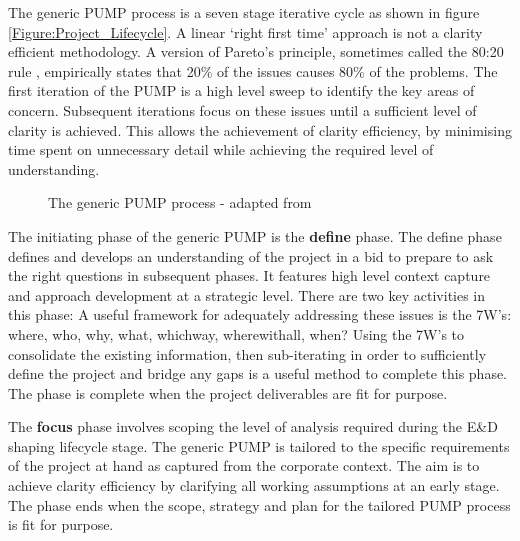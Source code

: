 The generic PUMP process is a seven stage iterative cycle as shown in figure \ref{Figure:Project_Lifecycle}. 
A linear `right first time' approach is not a clarity efficient methodology.
A version of Pareto's principle, sometimes called the 80:20 rule \citep{Pareto1992}, empirically states that 20\% of the issues causes 80\% of the problems. 
The first iteration of the PUMP is a high level sweep to identify the key areas of concern.
Subsequent iterations focus on these issues until a sufficient level of clarity is achieved.
This allows the achievement of clarity efficiency, by minimising time spent on unnecessary detail while achieving the required level of understanding.

\begin{figure}[!h]
  \centering
{} \quad
{}
\caption{The generic PUMP process - adapted from \cite{chapman}}
\label{Figure:GenericPUMP_Both}
\end{figure}

The initiating phase of the generic PUMP is the \textbf{define} phase.
The define phase defines and develops an understanding of the project in a bid to prepare to ask the right questions in subsequent phases.
It features high level context capture and approach development at a strategic level.
There are two key activities in this phase:
A useful framework for adequately addressing these issues is the 7W's: where, who, why, what, whichway, wherewithall, when? 
Using the 7W's to consolidate the existing information, then sub-iterating in order to sufficiently define the project and bridge any gaps is a useful method to complete this phase.
The phase is complete when the project deliverables are fit for purpose.

The \textbf{focus} phase involves scoping the level of analysis required during the E\&D shaping lifecycle stage.
The generic PUMP is tailored to the specific requirements of the project at hand as captured from the corporate context.
The aim is to achieve clarity efficiency by clarifying all working assumptions at an early stage.
The phase ends when the scope, strategy and plan for the tailored PUMP process is fit for purpose.

